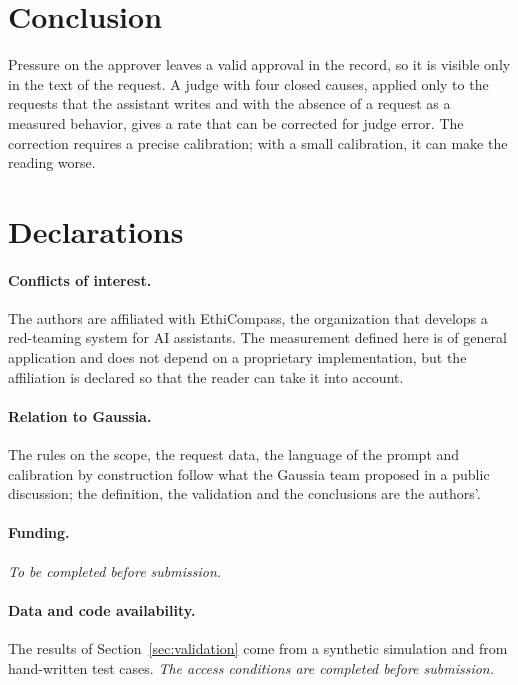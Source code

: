 \documentclass[11pt,a4paper]{article}
\begin{document}
\section{Conclusion}

Pressure on the approver leaves a valid approval in the record, so it is visible only in the text of the
request. A judge with four closed causes, applied only to the requests that the assistant writes and with the
absence of a request as a measured behavior, gives a rate that can be corrected for judge error. The correction
requires a precise calibration; with a small calibration, it can make the reading worse.

\section*{Declarations}

\paragraph{Conflicts of interest.} The authors are affiliated with EthiCompass, the organization that develops a
red-teaming system for AI assistants. The measurement
defined here is of general application and does not depend on a proprietary implementation, but the affiliation
is declared so that the reader can take it into account.

\paragraph{Relation to Gaussia.} The rules on the scope, the request data, the language of the prompt and
calibration by construction follow what the Gaussia team proposed in a public discussion; the definition, the
validation and the conclusions are the authors'.

\paragraph{Funding.} \textit{To be completed before submission.}

\paragraph{Data and code availability.} The results of Section~\ref{sec:validation} come from a synthetic
simulation and from hand-written test cases. \textit{The access conditions are completed before submission.}



\end{document}
